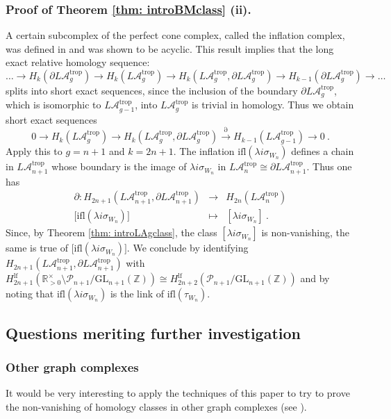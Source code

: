 \documentclass[10pt]{amsart}
\newcommand{\RR}{{\mathbb R}}
\newcommand{\ZZ}{{\mathbb Z}}
\theoremstyle{plain}
\newcommand{\LA}{L\mathcal{A}}
\newcommand{\GL}{\mathrm{GL}}
\newcommand{\trop}{\mathrm{trop}}
\newcommand{\To}{\longrightarrow}
\newcommand{\lf}{\mathrm{lf}}
\newcommand{\0}{\color{blue}{\mathsf{0}}}
\begin{document}
\subsubsection{Proof of Theorem  \ref{thm: introBMclass} (ii).}
A certain subcomplex of the perfect cone complex, called the inflation complex, was defined in \cite{TopWeightAg}  and was shown to  be acyclic. This  result implies that the long exact relative homology sequence:
\[ \ldots \To H_{k}(\partial \LA_g^{\trop}) \To H_k(\LA_g^{\trop}) \To H_k\left(\LA_g^{\trop}, \partial \LA_g^{\trop}\right) \To H_{k-1}(\partial \LA_g^{\trop})\To \ldots \]
splits into short exact sequences, since the inclusion of the boundary $\partial \LA_g^{\trop}$, which is isomorphic to $\LA_{g-1}^{\trop}$, into $\LA_g^{\trop}$ is trivial in homology. Thus we obtain short exact sequences
\[   0 \To H_k(\LA_g^{\trop}) \To H_k\left(\LA_g^{\trop}, \partial \LA_g^{\trop}\right) \overset{\partial}{\To} H_{k-1}(\LA_{g-1}^{\trop})\To 0   \ .  \]
Apply this to $g=n+1$ and $k=2n+1$. The inflation $\mathrm{ifl}( \lambda i\sigma_{W_n})$ defines a  chain 
in $\LA_{n+1}^{\trop}$ whose boundary is  the image of $\lambda i \sigma_{W_n}$ in $\LA_{n}^{\trop} \cong \partial \LA_{n+1}^{\trop}$.  
Thus one has 
\begin{eqnarray}   \partial: H_{2n+1}\left(\LA_{n+1}^{\trop}, \partial \LA_{n+1}^{\trop}\right) & \To&  H_{2n}(\LA_{n}^{\trop})   \nonumber \\
{[}\mathrm{ifl}(\lambda  i \sigma_{W_n})] & \mapsto & [\lambda i\sigma_{W_n}]\ . \nonumber 
\end{eqnarray}
Since, by Theorem \ref{thm: introLAgclass}, the class $[\lambda i \sigma_{W_n}]$ is non-vanishing, the same is true of ${[}\mathrm{ifl}(\lambda  i \sigma_{W_n})]$. We conclude by identifying $H_{2n+1}\left(\LA_{n+1}^{\trop}, \partial \LA_{n+1}^{\trop}\right)$
with $H_{2n+1}^{\lf}(\RR_{>0}^{\times} \setminus \mathcal{P}_{n+1}/\GL_{n+1}(\ZZ)) \cong  H_{2n+2}^{\lf}( \mathcal{P}_{n+1}/\GL_{n+1}(\ZZ)) $ and by noting that $\mathrm{ifl}(\lambda  i \sigma_{W_n})$ is the link of $\mathrm{ifl}(\tau_{W_n})$. 

\subsection{Questions meriting further investigation}

\subsubsection{Other graph complexes} It would be very interesting to apply the techniques of this paper to try to  prove  the non-vanishing of homology classes in other graph complexes (see \cite{Kontsevich93,ConantVogtmann}).
\end{document}
